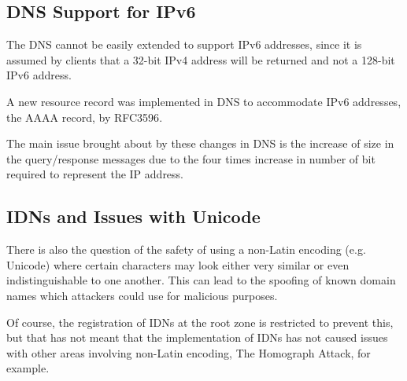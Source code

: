 \documentclass[11pt, a4paper]{article}
\begin{document}
\subsection{DNS Support for IPv6}
\label{subsec:dnsipv6}

The \gls{DNS} cannot be easily extended to support IPv6 addresses, since it is
assumed by clients that a 32-bit IPv4 address will be returned and not a 128-bit
IPv6 address.

A new resource record was implemented in \gls{DNS} to accommodate IPv6 
addresses, the AAAA record, by RFC3596\cite{rfc3596}.

The main issue brought about by these changes in \gls{DNS} is the increase of
size in the query/response messages due to the four times increase in number of
bit required to represent the IP address.

\subsection{IDNs and Issues with Unicode}
There is also the question of the safety of using a non-Latin encoding
(e.g. Unicode) where certain characters may look either very similar or even
indistinguishable to one another\cite{kaufman2013unicode}. This can lead to the
spoofing of known domain names which attackers could use for malicious purposes.

Of course, the registration of \glspl{IDN} at the root zone is restricted to
prevent this\cite{icann2011idns}, but that has not meant that the implementation of \glspl{IDN} has
not caused issues with other areas involving non-Latin encoding, The Homograph 
Attack\cite{gabrilovich2002homograph}, for example.


\newpage


\end{document}
